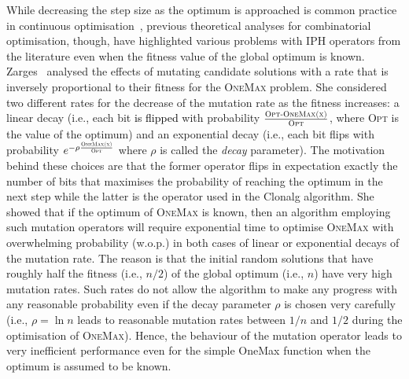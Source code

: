 \documentclass[lettersize,journal]{IEEEtran}
\newcommand{\new}[1]{\textcolor{black}{#1}}
\begin{document}
While decreasing the step size as the optimum is approached is common practice in continuous optimisation~\cite{AugerDoerrBook}, previous theoretical analyses for combinatorial optimisation, though, have highlighted various problems with %
IPH operators from the literature even when the fitness value of the global optimum is known.
Zarges~ \cite{Zarges2008} analysed the effects of mutating candidate solutions with a rate that is inversely proportional to their fitness for the \textsc{OneMax} problem.
She considered two different rates for the decrease of the mutation rate as the fitness increases: a linear decay (i.e., each bit \new{is flipped} with probability $\frac{\textsc{{\color{black}\text{Opt}-}OneMax(x)}}{\textsc{Opt}}$, where \textsc{Opt} is the value of the optimum) 
and an exponential decay (i.e., each bit flips with probability $e^{- \rho \frac{\textsc{OneMax(x)}}{\textsc{Opt}}}$ where $\rho$ is called the {\it decay} parameter).
The motivation behind these choices are that the former operator flips in expectation exactly the number of bits that maximises the probability of reaching the optimum in the next step while the latter is the
operator used in the Clonalg algorithm.  
She showed that if the optimum of \textsc{OneMax} is known, then an algorithm employing such mutation operator\new{s} will require exponential time to optimise \textsc{OneMax} with overwhelming probability (w.o.p.)
in both cases of linear or exponential decays of the mutation rate.
The reason is that the initial random solutions that have roughly half the fitness (i.e., $n/2$) of the global optimum (i.e., $n$) have very high mutation rates. Such rates do not allow the algorithm to make any progress with any reasonable probability even if the decay parameter $\rho$ is chosen very carefully (i.e., $\rho = \ln n$ leads to reasonable mutation rates between $1/n$ and $1/2$ %
during the optimisation of \textsc{OneMax}).
Hence, the behaviour of the mutation operator leads to very inefficient performance even for the simple OneMax function when the optimum is assumed to be known. 
\end{document}
